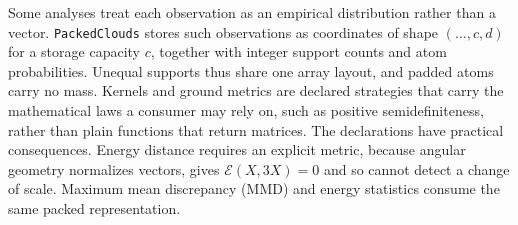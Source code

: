 Some analyses treat each observation as an empirical distribution rather than
a vector. \texttt{PackedClouds} stores such observations as coordinates of
shape $(\ldots, c, d)$ for a storage capacity $c$, together with integer
support counts and atom probabilities. Unequal supports thus share one array
layout, and padded atoms carry no mass. Kernels and ground metrics are declared
strategies that carry the mathematical laws a consumer may rely on, such as
positive semidefiniteness, rather than plain functions that return matrices.
The declarations have practical consequences. Energy distance requires an
explicit metric, because angular geometry normalizes vectors, gives
$\mathcal{E}(X, 3X) = 0$ and so cannot detect a change of scale. Maximum mean
discrepancy (MMD) and energy statistics
\citep{gretton-etal-2012,szekely-rizzo-2013,sejdinovic-equivalence-2013}
consume the same packed representation.
